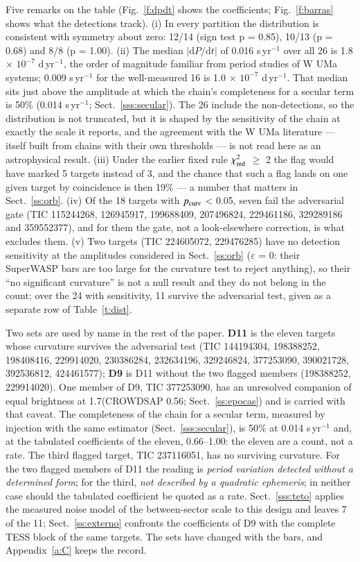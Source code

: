\documentclass{aa}
\begin{document}
Five remarks on the table (Fig.~\ref{f:dpdt} shows the coefficients; Fig.~\ref{f:barras} shows what the detections track). (i) In every partition the distribution is consistent with symmetry about zero: 12/14 (sign test p = 0.85), 10/13 (p = 0.68) and 8/8 (p = 1.00). (ii) The median $|\mathrm{d}P/\mathrm{d}t|$ of 0.016 s\,yr$^{-1}$ over all 26 is 1.8 $\times$ $10^{-7}$ d\,yr$^{-1}$, the order of magnitude familiar from period studies of W UMa systems; 0.009 s\,yr$^{-1}$ for the well-measured 16 is 1.0 $\times$ $10^{-7}$ d\,yr$^{-1}$. That median sits just above the amplitude at which the chain's completeness for a secular term is 50\% (0.014 s\,yr$^{-1}$; Sect.~\ref{sss:secular}). The 26 include the non-detections, so the distribution is not truncated, but it is shaped by the sensitivity of the chain at exactly the scale it reports, and the agreement with the W UMa literature --- itself built from chains with their own thresholds --- is not read here as an astrophysical result. (iii) Under the earlier fixed rule $\chi^2_{\rm red}$ $\ge$ 2 the flag would have marked 5 targets instead of 3, and the chance that such a flag lands on one given target by coincidence is then 19\% --- a number that matters in Sect.~\ref{ss:orb}. (iv) Of the 18 targets with $p_{\rm curv}$ < 0.05, seven fail the adversarial gate (TIC 115244268, 126945917, 199688409, 207496824, 229461186, 329289186 and 359552377), and for them the gate, not a look-elsewhere correction, is what excludes them. (v) Two targets (TIC 224605072, 229476285) have no detection sensitivity at the amplitudes considered in Sect.~\ref{ss:orb} ($\varepsilon$ = 0: their SuperWASP bars are too large for the curvature test to reject anything), so their ``no significant curvature'' is not a null result and they do not belong in the count; over the 24 with sensitivity, 11 survive the adversarial test, given as a separate row of Table~\ref{t:dist}.

Two sets are used by name in the rest of the paper. \textbf{D11} is the eleven targets whose curvature survives the adversarial test (TIC 144194304, 198388252, 198408416, 229914020, 230386284, 232634196, 329246824, 377253090, 390021728, 392536812, 424461577); \textbf{D9} is D11 without the two flagged members (198388252, 229914020). One member of D9, TIC 377253090, has an unresolved companion of equal brightness at 1.7\arcsec (CROWDSAP 0.56; Sect.~\ref{ss:epocas}) and is carried with that caveat. The completeness of the chain for a secular term, measured by injection with the same estimator (Sect.~\ref{sss:secular}), is 50\% at 0.014 s\,yr$^{-1}$ and, at the tabulated coefficients of the eleven, 0.66--1.00: the eleven are a count, not a rate. The third flagged target, TIC 237116051, has no surviving curvature. For the two flagged members of D11 the reading is \textit{period variation detected without a determined form}; for the third, \textit{not described by a quadratic ephemeris}; in neither case should the tabulated coefficient be quoted as a rate. Sect.~\ref{sss:teto} applies the measured noise model of the between-sector scale to this design and leaves 7 of the 11; Sect.~\ref{ss:externo} confronts the coefficients of D9 with the complete TESS block of the same targets. The sets have changed with the bars, and Appendix~\ref{a:C} keeps the record.
\end{document}
